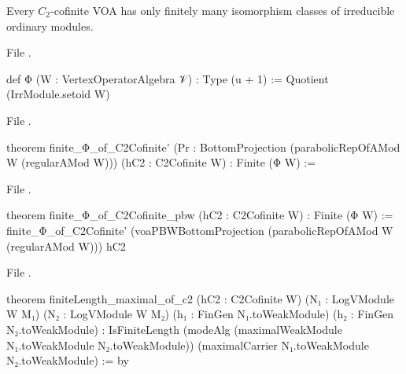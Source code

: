 \begin{theorem}\label{l21:thm:finitephi}
Every $C_2$-cofinite VOA has only finitely many isomorphism classes of irreducible ordinary modules.
\end{theorem}
\noindent File .
\begin{leancode}
def Φ (W : VertexOperatorAlgebra 𝒱) : Type (u + 1) := Quotient (IrrModule.setoid W)
\end{leancode}
\noindent File .
\begin{leancode}
theorem finite_Φ_of_C2Cofinite'
    (Pr : BottomProjection (parabolicRepOfAMod W (regularAMod W)))
    (hC2 : C2Cofinite W) : Finite (Φ W) :=
\end{leancode}
\noindent File .
\begin{leancode}
theorem finite_Φ_of_C2Cofinite_pbw (hC2 : C2Cofinite W) : Finite (Φ W) :=
  finite_Φ_of_C2Cofinite' (voaPBWBottomProjection (parabolicRepOfAMod W (regularAMod W))) hC2
\end{leancode}
\noindent File .
\begin{leancode}
theorem finiteLength_maximal_of_c2 (hC2 : C2Cofinite W)
    (N₁ : LogVModule W M₁) (N₂ : LogVModule W M₂)
    (h₁ : FinGen N₁.toWeakModule) (h₂ : FinGen N₂.toWeakModule) :
    IsFiniteLength (modeAlg (maximalWeakModule N₁.toWeakModule N₂.toWeakModule))
      (maximalCarrier N₁.toWeakModule N₂.toWeakModule) := by
\end{leancode}

